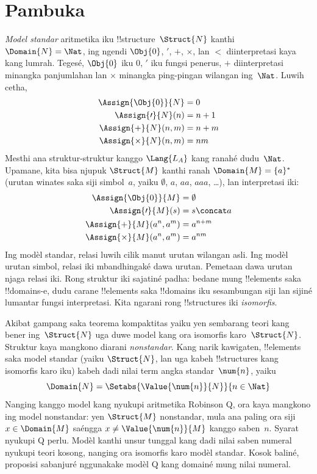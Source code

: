 \documentclass[../../../include/open-logic-section]{subfiles}
\begin{document}
\section{Pambuka}

\emph{Model standar} aritmetika
iku !!{structure}~$\Struct{N}$
kanthi $\Domain{N} = \Nat$,
ing ngendi $\Obj{0}$,
$\prime$, $+$, $\times$,
lan $<$ diinterpretasi
kaya kang lumrah.
Tegesé, $\Obj{0}$ iku $0$,
$\prime$ iku fungsi penerus,
$+$ diinterpretasi minangka
panjumlahan lan $\times$
minangka ping-pingan
wilangan ing~$\Nat$.
Luwih cetha,
\begin{align*}
  \Assign{\Obj{0}}{N} & = 0\\
  \Assign{\prime}{N}(n) & = n + 1\\
  \Assign{+}{N}(n, m) & = n + m\\
  \Assign{\times}{N}(n, m) & = nm
\end{align*}
Mesthi ana struktur-struktur
kanggo $\Lang{L_A}$ kang
ranahé dudu~$\Nat$.
Upamane, kita bisa njupuk
$\Struct{M}$ kanthi ranah
$\Domain{M} = \{a\}^*$
(urutan winates saka siji
simbol~$a$, yaiku
$\emptyset$, $a$, $aa$,
$aaa$, \dots), lan
interpretasi iki:
\begin{align*}
  \Assign{\Obj{0}}{M} & = \emptyset\\
  \Assign{\prime}{M}(s) & = s \concat a\\
  \Assign{+}{M}(a^n, a^m) & = a^{n + m}\\
  \Assign{\times}{M}(a^n, a^m) & = a^{nm}
\end{align*}
Ing modèl standar, relasi luwih cilik manut urutan wilangan asli. Ing modèl urutan simbol, relasi iki mbandhingaké dawa urutan. Pemetaan dawa urutan njaga relasi iki.
Rong struktur iki sajatiné
padha: bedane mung
!!{element}s saka
!!{domain}s-e, dudu
carane !!{element}s
saka !!{domain}s iku
sesambungan siji lan
sijiné lumantar
fungsi interpretasi.
Kita ngarani rong
!!{structure}s iki
\emph{isomorfis}.

Akibat gampang saka teorema
kompaktitas yaiku yen sembarang
teori kang bener ing~$\Struct{N}$
uga duwe model kang ora isomorfis
karo~$\Struct{N}$.
Struktur kaya mangkono
diarani \emph{nonstandar}.
Kang narik kawigaten,
!!{element}s saka model standar
(yaiku $\Struct{N}$, lan uga
kabeh !!{structure}s kang
isomorfis karo iku)
kabeh dadi nilai term angka
standar~$\num{n}$, yaiku
\[
\Domain{N} = \Setabs{\Value{\num{n}}{N}}{n \in \Nat}
\]
Nanging kanggo model kang nyukupi aritmetika Robinson Q, ora kaya mangkono
ing model nonstandar:
yen $\Struct{M}$ nonstandar,
mula ana paling ora siji
$x \in \Domain{M}$ saéngga
$x \neq \Value{\num{n}}{M}$
kanggo saben~$n$. Syarat nyukupi Q perlu. Modèl kanthi unsur tunggal kang dadi nilai saben numeral nyukupi teori kosong, nanging ora isomorfis karo modèl standar. Kosok baliné, proposisi sabanjuré nggunakake modèl Q kang domainé mung nilai numeral.
\end{document}
